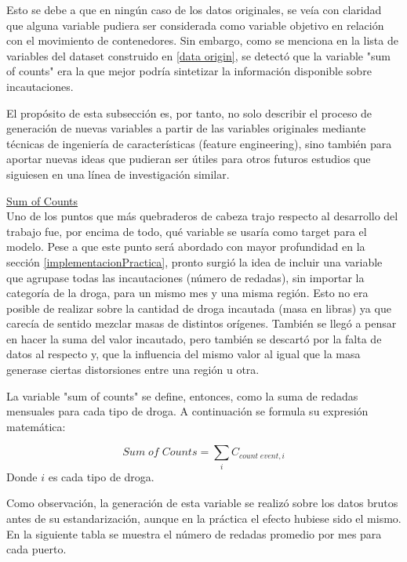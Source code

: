 \documentclass[12pt]{article}
\begin{document}
		Esto se debe a que en ningún caso de los datos originales, se veía con claridad que alguna variable pudiera ser considerada como variable objetivo en relación con el movimiento de contenedores. Sin embargo, como se menciona en la lista de variables del dataset construido en \ref{data origin}, se detectó que la variable "sum of counts" era la que mejor podría sintetizar la información disponible sobre incautaciones. 
		
		El propósito de esta subsección es, por tanto, no solo describir el proceso de generación de nuevas variables a partir de las variables originales mediante técnicas de ingeniería de características (feature engineering), sino también para aportar nuevas ideas que pudieran ser útiles para otros futuros estudios que siguiesen en una línea de investigación similar.
		
		\underline{Sum of Counts}\\
		Uno de los puntos que más quebraderos de cabeza trajo respecto al desarrollo del trabajo fue, por encima de todo, qué variable se usaría como target para el modelo. Pese a que este punto será abordado con mayor profundidad en la sección \ref{implementacionPractica}, pronto surgió la idea de incluir una variable que agrupase todas las incautaciones (número de redadas), sin importar la categoría de la droga, para un mismo mes y una misma región. Esto no era posible de realizar sobre la cantidad de droga incautada (masa en libras) ya que carecía de sentido mezclar masas de distintos orígenes. También se llegó a pensar en hacer la suma del valor incautado, pero también se descartó por la falta de datos al respecto y, que la influencia del mismo valor al igual que la masa generase ciertas distorsiones entre una región u otra.
		
		La variable "sum of counts" se define, entonces, como la suma de redadas mensuales para cada tipo de droga. A continuación se formula su expresión matemática:
		
		$$
		Sum\; of\; Counts = \sum_i C_{count\; event,i}
		$$
		Donde $i$ es cada tipo de droga.
		
		Como observación, la generación de esta variable se realizó sobre los datos brutos antes de su estandarización, aunque en la práctica el efecto hubiese sido el mismo. En la siguiente tabla se muestra el número de redadas promedio por mes para cada puerto.
		
\end{document}
